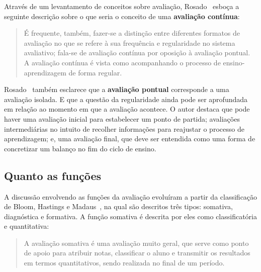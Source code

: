 Através de um levantamento de conceitos sobre avaliação, Rosado~\cite{rosado@conceitos} esboça a seguinte descrição sobre o que seria o conceito de uma \textbf{avaliação contínua}:
\begin{quote}
É frequente, também, fazer-se a distinção entre diferentes formatos de avaliação no que se refere à sua frequência e regularidade no sistema avaliativo; fala-se de avaliação contínua por oposição à avaliação pontual. A avaliação contínua é vista como acompanhando o processo de ensino-aprendizagem de forma regular.~\cite{rosado@conceitos}
\end{quote}%

Rosado~\cite{rosado@conceitos} também esclarece que a \textbf{avaliação pontual} corresponde a uma avaliação isolada. E que a questão da regularidade ainda pode ser aprofundada em relação ao momento em que a avaliação acontece. O autor destaca que pode haver uma avaliação inicial para estabelecer um ponto de partida; avaliações intermediárias no intuito de recolher informações para reajustar o processo de aprendizagem; e, uma avaliação final, que deve ser entendida como uma forma de concretizar um balanço no fim do ciclo de ensino. 





\subsection{Quanto as funções}%

A discussão envolvendo as funções da avaliação evoluíram a partir da classificação de Bloom, Hastings e Madaus~\cite{bloom1983manual}, na qual são descritos três tipos: somativa, diagnóstica e formativa. A função somativa é descrita por eles como classificatória e quantitativa:

\begin{quote}
A avaliação somativa é uma avaliação muito geral, que serve como ponto de apoio para atribuir notas, classificar o aluno e transmitir os resultados em termos quantitativos, sendo realizada no final de um período.~\cite{bloom1983manual}
\end{quote}

